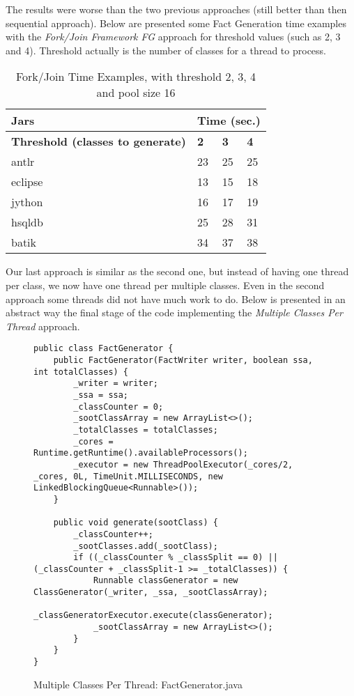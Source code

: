 \documentclass{dithesis}
\begin{document}
        The results were worse than the two previous approaches (still better than then sequential approach). Below are presented some Fact Generation time examples with the \textit{Fork/Join Framework FG} approach for threshold values (such as 2, 3 and 4). Threshold actually is the number of classes for a thread to process.
		\begin{table}[H]
			\centering
            \begin{tabular}{@{}l|lll@{}}
            \toprule
            \textbf{Jars}    	& \multicolumn{3}{l}{\textbf{Time (sec.)}}  \\ \midrule
            \textbf{Threshold (classes to generate)} 	& \textbf{2}  & \textbf{3}  & \textbf{4}  \\ \midrule
            antlr            	& 23          & 25           & 25           \\
            eclipse          	& 13          & 15           & 18           \\
            jython           	& 16          & 17           & 19           \\
            hsqldb           	& 25          & 28           & 31           \\
            batik            	& 34          & 37           & 38           \\ \bottomrule
            \end{tabular}
            \newline
			\caption{Fork/Join Time Examples, with threshold 2, 3, 4 and pool size 16}
		\end{table}


        Our last approach is similar as the second one, but instead of having one thread per class, we now have one thread per multiple classes. Even in the second approach some threads did not have much work to do. Below is presented in an abstract way the final stage of the code implementing the \textit{Multiple Classes Per Thread} approach.

        \begin{figure}[H]
\begin{lstlisting}
public class FactGenerator {
    public FactGenerator(FactWriter writer, boolean ssa, int totalClasses) {
        _writer = writer;
        _ssa = ssa;
        _classCounter = 0;
        _sootClassArray = new ArrayList<>();
        _totalClasses = totalClasses;
        _cores = Runtime.getRuntime().availableProcessors();
        _executor = new ThreadPoolExecutor(_cores/2, _cores, 0L, TimeUnit.MILLISECONDS, new LinkedBlockingQueue<Runnable>());
    }

    public void generate(sootClass) {
        _classCounter++;
        _sootClasses.add(_sootClass);
        if ((_classCounter % _classSplit == 0) || (_classCounter + _classSplit-1 >= _totalClasses)) {
            Runnable classGenerator = new ClassGenerator(_writer, _ssa, _sootClassArray);
            _classGeneratorExecutor.execute(classGenerator);
            _sootClassArray = new ArrayList<>();
        }
    }
}
\end{lstlisting}
        \caption{Multiple Classes Per Thread: FactGenerator.java}
        \end{figure}
\end{document}
